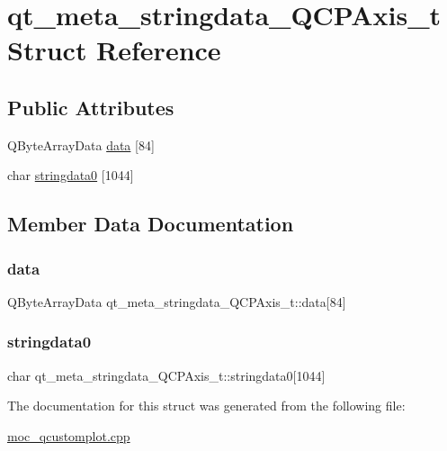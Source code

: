 \hypertarget{structqt__meta__stringdata__QCPAxis__t}{}\section{qt\+\_\+meta\+\_\+stringdata\+\_\+\+Q\+C\+P\+Axis\+\_\+t Struct Reference}
\label{structqt__meta__stringdata__QCPAxis__t}
\subsection*{Public Attributes}
\begin{DoxyCompactItemize}
\item 
Q\+Byte\+Array\+Data \mbox{\hyperlink{structqt__meta__stringdata__QCPAxis__t_ad6e7d43321d1d29667d8a964e8b94b03}{data}} \mbox{[}84\mbox{]}
\item 
char \mbox{\hyperlink{structqt__meta__stringdata__QCPAxis__t_a69e367a936d5d819080b35c76fe96c11}{stringdata0}} \mbox{[}1044\mbox{]}
\end{DoxyCompactItemize}


\subsection{Member Data Documentation}
\mbox{\label{structqt__meta__stringdata__QCPAxis__t_ad6e7d43321d1d29667d8a964e8b94b03}} 
\subsubsection{\texorpdfstring{data}{data}}
{\footnotesize\ttfamily Q\+Byte\+Array\+Data qt\+\_\+meta\+\_\+stringdata\+\_\+\+Q\+C\+P\+Axis\+\_\+t\+::data\mbox{[}84\mbox{]}}

\mbox{\label{structqt__meta__stringdata__QCPAxis__t_a69e367a936d5d819080b35c76fe96c11}} 
\subsubsection{\texorpdfstring{stringdata0}{stringdata0}}
{\footnotesize\ttfamily char qt\+\_\+meta\+\_\+stringdata\+\_\+\+Q\+C\+P\+Axis\+\_\+t\+::stringdata0\mbox{[}1044\mbox{]}}



The documentation for this struct was generated from the following file\+:\begin{DoxyCompactItemize}
\item 
\mbox{\hyperlink{moc__qcustomplot_8cpp}{moc\+\_\+qcustomplot.\+cpp}}\end{DoxyCompactItemize}
